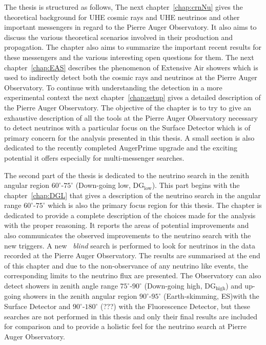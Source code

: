 The thesis is structured as follows, The next chapter~\ref{chap:crnNu} gives the theoretical background for UHE cosmic rays and UHE neutrinos and other important messengers in regard to the Pierre Auger Observatory. It also aims to discuss the various theoretical scenarios involved in their production and propagation. The chapter also aims to summarize the important recent results for these messengers and the various interesting open questions for them. The next chapter~\ref{chap:EAS} describes the phenomenon of Extensive Air showers which is used to indirectly detect both the cosmic rays and neutrinos at the Pierre Auger Observatory. To continue with understanding the detection in a more experimental context the next chapter~\ref{chap:setup} gives a detailed description of the Pierre Auger Observatory. The objective of the chapter is to try to give an exhaustive description of all the tools at the Pierre Auger Observatory necessary to detect neutrinos with a particular focus on the Surface Detector which is of primary concern for the analysis presented in this thesis. A small section is also dedicated to the recently completed AugerPrime upgrade and the exciting potential it offers especially for multi-messenger searches. 

The second part of the thesis is dedicated to the neutrino search in the zenith angular region $60^\circ$-$75^\circ$ (Down-going low, DG$\mathrm{_{low}}$). This part begins with the chapter~\ref{chap:DGL} that gives a description of the neutrino search in the angular range $60^\circ$-$75^\circ$ which is also the primary focus region for this thesis. The chapter is dedicated to provide a complete description of the choices made for the analysis with the proper reasoning. It reports the areas of potential improvements and also communicates the observed improvements to the neutrino search with the new triggers. A new ~\textit{blind} search is performed to look for neutrinos in the data recorded at the Pierre Auger Observatory. The results are summarised at the end of this chapter and due to the non-observance of any neutrino like events, the corresponding limits to the neutrino flux are presented. The Observatory can also detect showers in zenith angle range $75^\circ$-$90^\circ$ (Down-going high, DG$\mathrm{_{high}}$) and up-going showers in the zenith angular region $90^\circ$-$95^\circ$ (Earth-skimming, ES)with the Surface Detector and $90^\circ$-$180^\circ$ (???) with the Fluorescence Detector, but these searches are not performed in this thesis and only their final results are included for comparison and to provide a holistic feel for the neutrino search at Pierre Auger Observatory.


